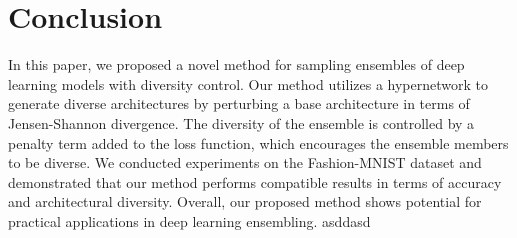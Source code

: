 \documentclass{article}
\begin{document}
\section{Conclusion}

In this paper, we proposed a novel method for sampling ensembles of deep learning models with diversity control.
Our method utilizes a hypernetwork to generate diverse architectures by perturbing a base architecture in terms of Jensen-Shannon divergence.
The diversity of the ensemble is controlled by a penalty term added to the loss function, which encourages the ensemble members to be diverse.
We conducted experiments on the Fashion-MNIST dataset and demonstrated that our method performs compatible results in terms of accuracy and architectural diversity.
Overall, our proposed method shows potential for practical applications in deep learning ensembling. asddasd


\end{document}
